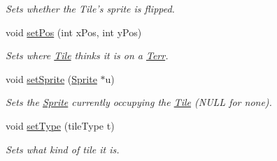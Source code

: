 \begin{DoxyCompactItemize}
\begin{DoxyCompactList}\small\item\em Sets whether the Tile’s sprite is flipped. \end{DoxyCompactList}\item 
void \hyperlink{class_tile_a8a6429d2adbe3e45c519d86a57b514c3}{set\+Pos} (int x\+Pos, int y\+Pos)\hypertarget{class_tile_a8a6429d2adbe3e45c519d86a57b514c3}{}\label{class_tile_a8a6429d2adbe3e45c519d86a57b514c3}

\begin{DoxyCompactList}\small\item\em Sets where \hyperlink{class_tile}{Tile} thinks it is on a \hyperlink{class_terr}{Terr}. \end{DoxyCompactList}\item 
void \hyperlink{class_tile_ad85c92ea426639130cc1d0d38641da3c}{set\+Sprite} (\hyperlink{class_sprite}{Sprite} $\ast$u)\hypertarget{class_tile_ad85c92ea426639130cc1d0d38641da3c}{}\label{class_tile_ad85c92ea426639130cc1d0d38641da3c}

\begin{DoxyCompactList}\small\item\em Sets the \hyperlink{class_sprite}{Sprite} currently occupying the \hyperlink{class_tile}{Tile} (N\+U\+LL for none). \end{DoxyCompactList}\item 
void \hyperlink{class_tile_a2557595d030a43cf9b5334df3b7264f7}{set\+Type} (tile\+Type t)\hypertarget{class_tile_a2557595d030a43cf9b5334df3b7264f7}{}\label{class_tile_a2557595d030a43cf9b5334df3b7264f7}

\begin{DoxyCompactList}\small\item\em Sets what kind of tile it is. \end{DoxyCompactList}\end{DoxyCompactItemize}
